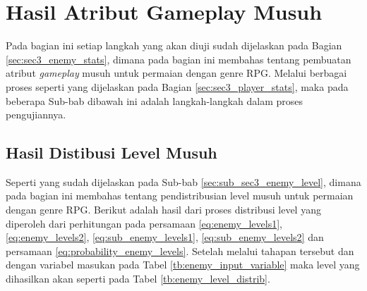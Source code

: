 \section{Hasil Atribut Gameplay Musuh}
\label{sec:sec4_eval_turn-based_enemy}
\vspace{1ex}

Pada bagian ini setiap langkah yang akan diuji sudah dijelaskan pada Bagian \ref{sec:sec3_enemy_stats}, dimana pada bagian ini membahas tentang pembuatan atribut \textit{gameplay} musuh untuk permaian dengan genre RPG. Melalui berbagai proses seperti yang dijelaskan pada Bagian \ref{sec:sec3_player_stats}, maka pada beberapa Sub-bab dibawah ini adalah langkah-langkah dalam proses pengujiannya.
\vspace{1ex}


\subsection{Hasil Distibusi Level Musuh}
\label{sec:sub_sec4_eval_dist_enemy_level}
\vspace{1ex}

Seperti yang sudah dijelaskan pada Sub-bab \ref{sec:sub_sec3_enemy_level}, dimana pada bagian ini membahas tentang pendistribusian level musuh untuk permaian dengan genre RPG. Berikut adalah hasil dari proses distribusi level yang diperoleh dari perhitungan pada persamaan \ref{eq:enemy_levels1}, \ref{eq:enemy_levels2}, \ref{eq:sub_enemy_levels1}, \ref{eq:sub_enemy_levels2} dan persamaan \ref{eq:probability_enemy_levels}. Setelah melalui tahapan tersebut dan dengan variabel masukan pada Tabel \ref{tb:enemy_input_variable} maka level yang dihasilkan akan seperti pada Tabel \ref{tb:enemy_level_distrib}.
\vspace{-1ex}

